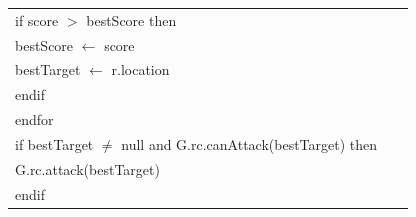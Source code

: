 \documentclass{article}
\newenvironment{pseudobox}
{
\centering
\begin{longtable}{|p{0.94\linewidth}|}
\hline
}
{
\\ \hline
\end{longtable}
\vspace{0.05cm}
}
\begin{document}
\begin{pseudobox}
\hspace*{2em} if score $>$ bestScore then \\
\hspace*{3em} bestScore $\leftarrow$ score \\
\hspace*{3em} bestTarget $\leftarrow$ r.location \\
\hspace*{2em} endif \\
\hspace*{1em} endfor \\

\hspace*{1em} if bestTarget $\neq$ null and G.rc.canAttack(bestTarget) then \\
\hspace*{2em} G.rc.attack(bestTarget) \\
\hspace*{1em} endif
\end{pseudobox}
\end{document}
